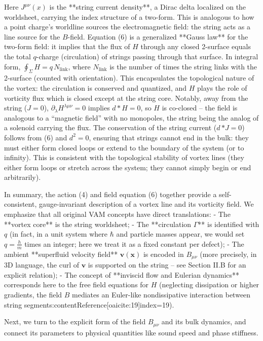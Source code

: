 \documentclass[12pt]{article}
\begin{document}
Here $J^{\mu\nu}(x)$ is the **string current density**, a Dirac delta localized on the worldsheet, carrying the index structure of a two-form. This is analogous to how a point charge’s worldline sources the electromagnetic field: the string acts as a line source for the $B$-field. Equation (6) is a generalized **Gauss law** for the two-form field: it implies that the flux of $H$ through any closed 2-surface equals the total $q$-charge (circulation) of strings passing through that surface. In integral form, $\oint_{\Sigma} H = q \,N_{\text{link}}$, where $N_{\text{link}}$ is the number of times the string links with the 2-surface (counted with orientation). This encapsulates the topological nature of the vortex: the circulation is conserved and quantized, and $H$ plays the role of vorticity flux which is closed except at the string core. Notably, away from the string ($J=0$), $\partial_\lambda H^{\lambda\mu\nu}=0$ implies $d*H=0$, so $H$ is co-closed – the field is analogous to a “magnetic field” with no monopoles, the string being the analog of a solenoid carrying the flux. The conservation of the string current ($d\,{*J}=0$) follows from (6) and $d^2=0$, ensuring that strings cannot end in the bulk: they must either form closed loops or extend to the boundary of the system (or to infinity). This is consistent with the topological stability of vortex lines (they either form loops or stretch across the system; they cannot simply begin or end arbitrarily). 

In summary, the action (4) and field equation (6) together provide a self-consistent, gauge-invariant description of a vortex line and its vorticity field. We emphasize that all original VAM concepts have direct translations: 
- The **vortex core** is the string worldsheet; 
- The **circulation $\Gamma$** is identified with $q$ (in fact, in a unit system where $\hbar$ and particle masses appear, we would set $q = \frac{h}{m}$ times an integer; here we treat it as a fixed constant per defect);
- The ambient **superfluid velocity field** $\mathbf{v}(\mathbf{x})$ is encoded in $B_{\mu\nu}$ (more precisely, in 3D language, the curl of $\mathbf{v}$ is supported on the string – see Section II.B for an explicit relation);
- The concept of **inviscid flow and Eulerian dynamics** corresponds here to the free field equations for $H$ (neglecting dissipation or higher gradients, the field $B$ mediates an Euler-like nondissipative interaction between string segments:contentReference[oaicite:19]{index=19}).

Next, we turn to the explicit form of the field $B_{\mu\nu}$ and its bulk dynamics, and connect its parameters to physical quantities like sound speed and phase stiffness.
\end{document}

